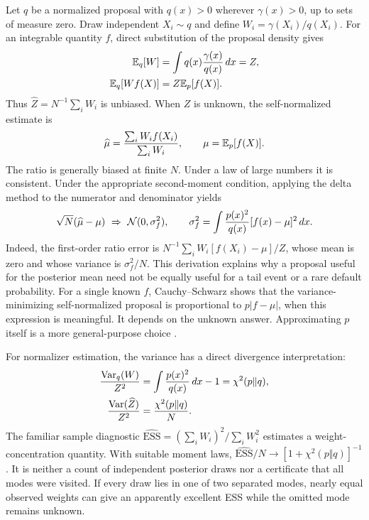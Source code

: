 Let $q$ be a normalized proposal with $q(x)>0$ wherever $\gamma(x)>0$, up to
sets of measure zero. Draw independent $X_i\sim q$ and define
$W_i=\gamma(X_i)/q(X_i)$. For an integrable quantity $f$, direct substitution
of the proposal density gives
\begin{align}
 \mathbb{E}_q[W]&=\int q(x)\frac{\gamma(x)}{q(x)}\,dx=Z,\\
 \mathbb{E}_q[Wf(X)]&=Z\mathbb{E}_p[f(X)].
 \label{eq:bf-is-change-measure}
\end{align}
Thus $\widehat Z=N^{-1}\sum_iW_i$ is unbiased. When $Z$ is unknown, the
self-normalized estimate is
\begin{equation}
 \widehat\mu=\frac{\sum_iW_if(X_i)}{\sum_iW_i},\qquad
 \mu=\mathbb{E}_p[f(X)].
 \label{eq:bf-is-snis}
\end{equation}
The ratio is generally biased at finite $N$. Under a law of large numbers it
is consistent. Under the appropriate second-moment condition, applying the
delta method to the numerator and denominator yields
\begin{equation}
 \sqrt N(\widehat\mu-\mu)\ \Rightarrow\
 \mathcal{N}(0,\sigma_f^2),\qquad
 \sigma_f^2=\int\frac{p(x)^2}{q(x)}[f(x)-\mu]^2\,dx.
 \label{eq:bf-is-snis-variance}
\end{equation}
Indeed, the first-order ratio error is
$N^{-1}\sum_i W_i[f(X_i)-\mu]/Z$, whose mean is zero and whose variance is
$\sigma_f^2/N$. This derivation explains why a proposal useful for the posterior
mean need not be equally useful for a tail event or a rare default probability.
For a single known $f$, Cauchy--Schwarz shows that the variance-minimizing
self-normalized proposal is proportional to $p|f-\mu|$, when this expression
is meaningful. It depends on the unknown answer. Approximating $p$ itself is a
more general-purpose choice \citep[Chapter 9]{owen2013mc}.

For normalizer estimation, the variance has a direct divergence interpretation:
\begin{align}
 \frac{\operatorname{Var}_q(W)}{Z^2}
 &=\int\frac{p(x)^2}{q(x)}\,dx-1
 =\chi^2(p\Vert q),\\
 \frac{\operatorname{Var}(\widehat Z)}{Z^2}&=\frac{\chi^2(p\Vert q)}{N}.
 \label{eq:bf-is-chi-square}
\end{align}
The familiar sample diagnostic
$\widehat{\mathrm{ESS}}=(\sum_iW_i)^2/\sum_iW_i^2$ estimates a weight-concentration
quantity. With suitable moment laws,
$\widehat{\mathrm{ESS}}/N\to[1+\chi^2(p\Vert q)]^{-1}$. It is neither a count
of independent posterior draws nor a certificate that all modes were visited.
If every draw lies in one of two separated modes, nearly equal observed weights
can give an apparently excellent ESS while the omitted mode remains unknown.

